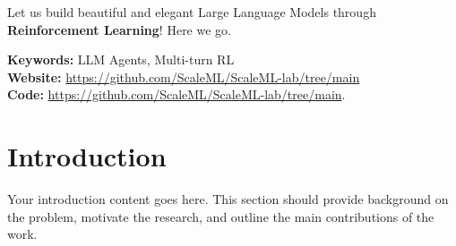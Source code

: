 \documentclass[11pt,letterpaper]{article}
\begin{document}
\vspace{0.2in}

\begin{tcolorbox}[
    colback=abscol,
    colframe=abscol,
    boxrule=0.5pt,
    arc=3pt,
    left=10pt,
    right=10pt,
    top=10pt,
    bottom=10pt
]
Let us build beautiful and elegant Large Language Models through \textbf{Reinforcement Learning}! Here we go.

\textbf{Keywords:} LLM Agents, Multi-turn RL\\
\textbf{Website:} \url{https://github.com/ScaleML/ScaleML-lab/tree/main}\\
\textbf{Code:} \url{https://github.com/ScaleML/ScaleML-lab/tree/main}.
\end{tcolorbox}

\section{Introduction}

Your introduction content goes here. This section should provide background on the problem, motivate the research, and outline the main contributions of the work.



\end{document}
